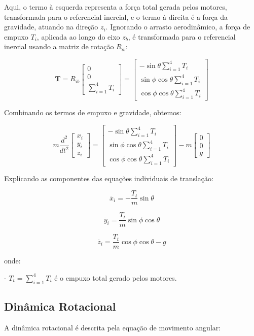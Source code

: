 Aqui, o termo à esquerda representa a força total gerada pelos motores, transformada para o referencial inercial, e o termo à direita é a força da gravidade, atuando na direção \(z_i\). Ignorando o arrasto aerodinâmico, a força de empuxo \(T_i\), aplicada ao longo do eixo \(z_b\), é transformada para o referencial inercial usando a matriz de rotação \(R_{ib}\):

\[
\mathbf{T} = R_{ib} \begin{bmatrix} 
0 \\
0 \\
\sum_{i=1}^{4} T_i 
\end{bmatrix}
=
\begin{bmatrix} 
-\sin\theta \sum_{i=1}^{4} T_i \\
\sin\phi \cos\theta \sum_{i=1}^{4} T_i \\
\cos\phi \cos\theta \sum_{i=1}^{4} T_i
\end{bmatrix}
\tag{7}
\]

Combinando os termos de empuxo e gravidade, obtemos:

\[
m \frac{d^2}{dt^2} \begin{bmatrix} 
x_i \\ 
y_i \\ 
z_i 
\end{bmatrix}
=
\begin{bmatrix} 
-\sin\theta \sum_{i=1}^{4} T_i \\
\sin\phi \cos\theta \sum_{i=1}^{4} T_i \\
\cos\phi \cos\theta \sum_{i=1}^{4} T_i
\end{bmatrix}
- m \begin{bmatrix}
0 \\
0 \\
g
\end{bmatrix}
\tag{8}
\]

Explicando as componentes das equações individuais de translação:

\[
\ddot{x_i} = -\frac{T_t}{m} \sin\theta
\tag{9}
\]

\[
\ddot{y_i} = \frac{T_t}{m} \sin\phi \cos\theta
\tag{10}
\]

\[
\ddot{z_i} = \frac{T_t}{m} \cos\phi \cos\theta - g
\tag{11}
\]

onde:

- \(T_t = \sum_{i=1}^{4} T_i\) é o empuxo total gerado pelos motores.

\subsection{Dinâmica Rotacional}
A dinâmica rotacional é descrita pela equação de movimento angular:

